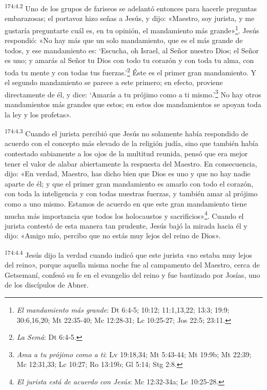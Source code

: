 \par 
\textsuperscript{174:4.2} Uno de los grupos de fariseos se adelantó entonces para hacerle preguntas embarazosas; el portavoz hizo señas a Jesús, y dijo: «Maestro, soy jurista, y me gustaría preguntarte cuál es, en tu opinión, el mandamiento más grande»\footnote{\textit{El mandamiento más grande}: Dt 6:4-5; 10:12; 11:1,13,22; 13:3; 19:9; 30:6,16,20; Mt 22:35-40; Mc 12:28-31; Lc 10:25-27; Jos 22:5; 23:11.}. Jesús respondió: «No hay más que un solo mandamiento, que es el más grande de todos, y ese mandamiento es: `Escucha, oh Israel, al Señor nuestro Dios; el Señor es uno; y amarás al Señor tu Dios con todo tu corazón y con toda tu alma, con toda tu mente y con todas tus fuerzas.'\footnote{\textit{La Semá}: Dt 6:4-5.} Éste es el primer gran mandamiento. Y el segundo mandamiento se parece a este primero; en efecto, proviene directamente de él, y dice: `Amarás a tu prójimo como a ti mismo.'\footnote{\textit{Ama a tu prójimo como a ti}: Lv 19:18,34; Mt 5:43-44; Mt 19:9b; Mt 22:39; Mc 12:31,33; Lc 10:27; Ro 13:19b; Gl 5:14; Stg 2:8.} No hay otros mandamientos más grandes que estos; en estos dos mandamientos se apoyan toda la ley y los profetas».

\par 
\textsuperscript{174:4.3} Cuando el jurista percibió que Jesús no solamente había respondido de acuerdo con el concepto más elevado de la religión judía, sino que también había contestado sabiamente a los ojos de la multitud reunida, pensó que era mejor tener el valor de alabar abiertamente la respuesta del Maestro. En consecuencia, dijo: «En verdad, Maestro, has dicho bien que Dios es uno y que no hay nadie aparte de él; y que el primer gran mandamiento es amarlo con todo el corazón, con toda la inteligencia y con todas nuestras fuerzas, y también amar al prójimo como a uno mismo. Estamos de acuerdo en que este gran mandamiento tiene mucha más importancia que todos los holocaustos y sacrificios»\footnote{\textit{El jurista está de acuerdo con Jesús}: Mc 12:32-34a; Lc 10:25-28.}. Cuando el jurista contestó de esta manera tan prudente, Jesús bajó la mirada hacia él y dijo: «Amigo mío, percibo que no estás muy lejos del reino de Dios».

\par 
\textsuperscript{174:4.4} Jesús dijo la verdad cuando indicó que este jurista «no estaba muy lejos del reino», porque aquella misma noche fue al campamento del Maestro, cerca de Getsemaní, confesó su fe en el evangelio del reino y fue bautizado por Josías, uno de los discípulos de Abner.

